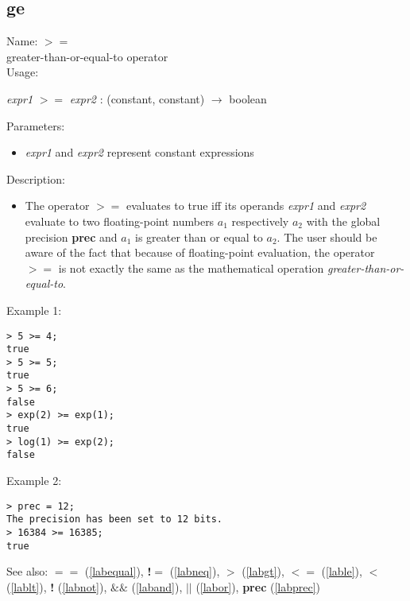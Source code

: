 \subsection{ge}
\label{labge}
\noindent Name: \textbf{$>=$}\\
greater-than-or-equal-to operator\\

\noindent Usage: 
\begin{center}
\emph{expr1} \textbf{$>=$} \emph{expr2} : (\textsf{constant}, \textsf{constant}) $\rightarrow$ \textsf{boolean}\\
\end{center}
Parameters: 
\begin{itemize}
\item \emph{expr1} and \emph{expr2} represent constant expressions
\end{itemize}
\noindent Description: \begin{itemize}

\item The operator \textbf{$>=$} evaluates to true iff its operands \emph{expr1} and
   \emph{expr2} evaluate to two floating-point numbers $a_1$
   respectively $a_2$ with the global precision \textbf{prec} and
   $a_1$ is greater than or equal to $a_2$. The user should
   be aware of the fact that because of floating-point evaluation, the
   operator \textbf{$>=$} is not exactly the same as the mathematical
   operation \emph{greater-than-or-equal-to}.
\end{itemize}
\noindent Example 1: 
\begin{center}\begin{minipage}{15cm}\begin{Verbatim}[frame=single]
> 5 >= 4;
true
> 5 >= 5;
true
> 5 >= 6;
false
> exp(2) >= exp(1);
true
> log(1) >= exp(2);
false
\end{Verbatim}
\end{minipage}\end{center}
\noindent Example 2: 
\begin{center}\begin{minipage}{15cm}\begin{Verbatim}[frame=single]
> prec = 12;
The precision has been set to 12 bits.
> 16384 >= 16385;
true
\end{Verbatim}
\end{minipage}\end{center}
See also: \textbf{$==$} (\ref{labequal}), \textbf{!$=$} (\ref{labneq}), \textbf{$>$} (\ref{labgt}), \textbf{$<=$} (\ref{lable}), \textbf{$<$} (\ref{lablt}), \textbf{!} (\ref{labnot}), \textbf{$\&\&$} (\ref{laband}), \textbf{$||$} (\ref{labor}), \textbf{prec} (\ref{labprec})
